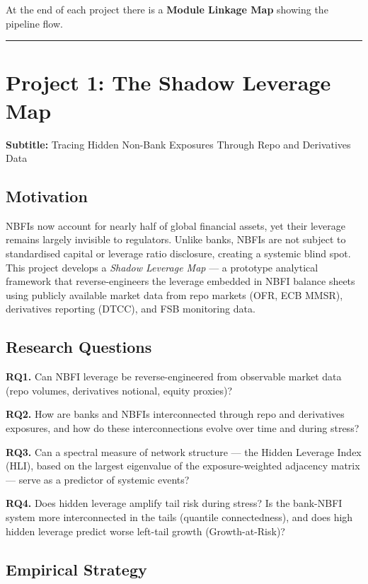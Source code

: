 \documentclass[11pt,a4paper]{article}
\begin{document}
At the end of each project there is a \textbf{Module Linkage Map} showing the pipeline flow.


\bigskip\noindent\rule{\textwidth}{0.4pt}\bigskip


\section{Project 1: The Shadow Leverage Map}

\textbf{Subtitle:} Tracing Hidden Non-Bank Exposures Through Repo and Derivatives Data


\subsection{Motivation}

NBFIs now account for nearly half of global financial assets, yet their leverage
remains largely invisible to regulators. Unlike banks, NBFIs are not subject to
standardised capital or leverage ratio disclosure, creating a systemic blind spot.
This project develops a \textit{Shadow Leverage Map} --- a prototype analytical framework
that reverse-engineers the leverage embedded in NBFI balance sheets using publicly
available market data from repo markets (OFR, ECB MMSR), derivatives reporting
(DTCC), and FSB monitoring data.


\subsection{Research Questions}

\textbf{RQ1.} Can NBFI leverage be reverse-engineered from observable market data
(repo volumes, derivatives notional, equity proxies)?

\textbf{RQ2.} How are banks and NBFIs interconnected through repo and derivatives
exposures, and how do these interconnections evolve over time and during stress?

\textbf{RQ3.} Can a spectral measure of network structure --- the Hidden Leverage Index
(HLI), based on the largest eigenvalue of the exposure-weighted adjacency matrix
--- serve as a predictor of systemic events?

\textbf{RQ4.} Does hidden leverage amplify tail risk during stress? Is the bank-NBFI
system more interconnected in the tails (quantile connectedness), and does high
hidden leverage predict worse left-tail growth (Growth-at-Risk)?


\subsection{Empirical Strategy}
\end{document}

